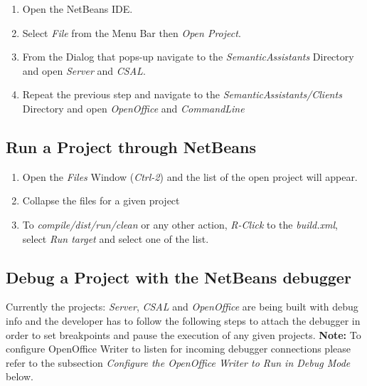 \begin{enumerate}
  \item Open the NetBeans IDE.
  \item Select \emph{File} from the Menu Bar then \emph{Open Project}.
  \item From the Dialog that pops-up navigate to the \emph{SemanticAssistants} Directory and open \emph{Server} and \emph{CSAL}. 
  \item Repeat the previous step and navigate to the \emph{SemanticAssistants/Clients} Directory and open \emph{OpenOffice} and \emph{CommandLine} 
\end{enumerate}

\subsection{Run a Project through NetBeans}

\begin{enumerate}
  \item Open the \emph{Files} Window (\emph{Ctrl-2}) and the list of the open project will appear.
  \item Collapse the files for a given project
  \item To \emph{compile/dist/run/clean} or any other action, \emph{R-Click} to the \emph{build.xml}, select \emph{Run target} and select one of the list.
\end{enumerate}

\subsection{Debug a Project with the NetBeans debugger}
\label{sec:debug}
Currently the projects: \emph{Server}, \emph{CSAL} and \emph{OpenOffice} are
being built with debug info and the developer has to follow the following
steps to attach the debugger in order to set breakpoints and pause the
execution of any given projects.  \textbf{Note:} To configure OpenOffice Writer
  to listen for incoming debugger connections please refer to the subsection 
  \emph{Configure the OpenOffice Writer to Run in Debug Mode} below.

